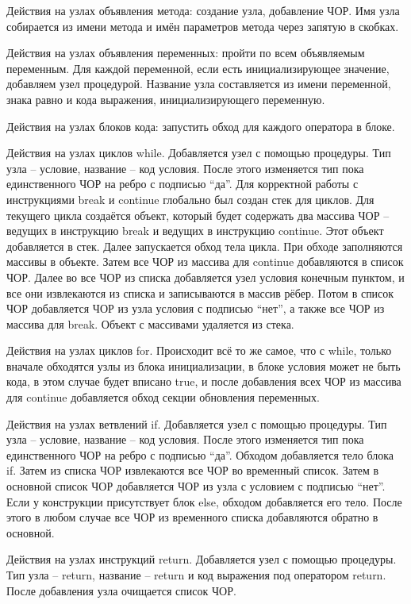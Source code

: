 Действия на узлах объявления метода: создание узла, добавление ЧОР. Имя узла собирается из имени метода и имён параметров метода через запятую в скобках.

Действия на узлах объявления переменных: пройти по всем объявляемым переменным. Для каждой переменной, если есть инициализирующее значение, добавляем узел процедурой. Название узла составляется из имени переменной, знака равно и кода выражения, инициализирующего переменную.

Действия на узлах блоков кода: запустить обход для каждого оператора в блоке.

Действия на узлах циклов while. Добавляется узел с помощью процедуры. Тип узла – условие, название – код условия. После этого изменяется тип пока единственного ЧОР на ребро с подписью “да”. Для корректной работы с инструкциями break и continue глобально был создан стек для циклов. Для текущего цикла создаётся объект, который будет содержать два массива ЧОР – ведущих в инструкцию break и ведущих в инструкцию continue. Этот объект добавляется в стек. Далее запускается обход тела цикла. При обходе заполняются массивы в объекте. Затем все ЧОР из массива для continue добавляются в список ЧОР. Далее во все ЧОР из списка добавляется узел условия конечным пунктом, и все они извлекаются из списка и записываются в массив рёбер. Потом в список ЧОР добавляется ЧОР из узла условия с подписью “нет”, а также все ЧОР из массива для break. Объект с массивами удаляется из стека.

Действия на узлах циклов for. Происходит всё то же самое, что с while, только вначале обходятся узлы из блока инициализации, в блоке условия может не быть кода, в этом случае будет вписано true, и после добавления всех ЧОР из массива для continue добавляется обход секции обновления переменных.

Действия на узлах ветвлений if. Добавляется узел с помощью процедуры. Тип узла – условие, название – код условия. После этого изменяется тип пока единственного ЧОР на ребро с подписью “да”. Обходом добавляется тело блока if. Затем из списка ЧОР извлекаются все ЧОР во временный список. Затем в основной список ЧОР добавляется ЧОР из узла с условием с подписью “нет”. Если у конструкции присутствует блок else, обходом добавляется его тело. После этого в любом случае все ЧОР из временного списка добавляются обратно в основной.

Действия на узлах инструкций return. Добавляется узел с помощью процедуры. Тип узла – return, название – return и код выражения под оператором return. После добавления узла очищается список ЧОР.

